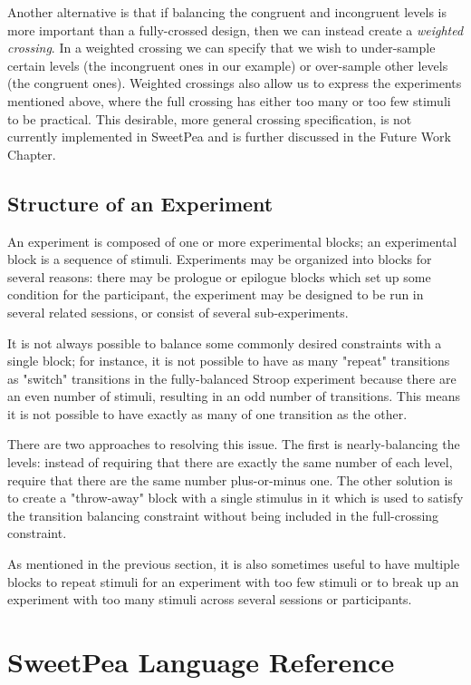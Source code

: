 Another alternative is that if balancing the congruent and incongruent levels is more important than a fully-crossed design, then we can instead create a \emph{weighted crossing}. In a weighted crossing we can specify that we wish to under-sample certain levels (the incongruent ones in our example) or over-sample other levels (the congruent ones). Weighted crossings also allow us to express the experiments mentioned above, where the full crossing has either too many or too few stimuli to be practical. This desirable, more general crossing specification, is not currently implemented in SweetPea and is further discussed in the Future Work Chapter.

\subsection{Structure of an Experiment}

An experiment is composed of one or more experimental blocks; an experimental block is a sequence of stimuli. Experiments may be organized into blocks for several reasons: there may be prologue or epilogue blocks which set up some condition for the participant, the experiment may be designed to be run in several related sessions, or consist of several sub-experiments.

It is not always possible to balance some commonly desired constraints with a single block; for instance, it is not possible to have as many "repeat" transitions as "switch" transitions in the fully-balanced Stroop experiment because there are an even number of stimuli, resulting in an odd number of transitions. This means it is not possible to have exactly as many of one transition as the other.

There are two approaches to resolving this issue. The first is nearly-balancing the levels: instead of requiring that there are exactly the same number of each level, require that there are the same number plus-or-minus one. The other solution is to create a "throw-away" block with a single stimulus in it which is used to satisfy the transition balancing constraint without being included in the full-crossing constraint.

As mentioned in the previous section, it is also sometimes useful to have multiple blocks to repeat stimuli for an experiment with too few stimuli or to break up an experiment with too many stimuli across several sessions or participants.

\section{SweetPea Language Reference}

